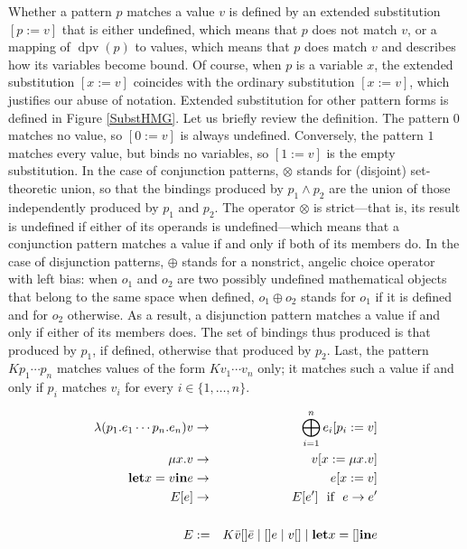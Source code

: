 \documentclass{article}
\newcommand{\assign}{:=}
\newcommand{\tmop}[1]{\ensuremath{\operatorname{#1}}}
\newcommand{\tmstrong}[1]{\textbf{#1}}
\begin{document}
Whether a pattern $p$ matches a value $v$ is defined by an extended
substitution $[p \assign v]$ that is either undefined, which means that $p$
does not match $v$, or a mapping of $\tmop{dpv} (p)$ to values, which means
that $p$ does match $v$ and describes how its variables become bound. Of
course, when $p$ is a variable $x$, the extended substitution $[x \assign v]$
coincides with the ordinary substitution $[x \assign v]$, which justifies our
abuse of notation. Extended substitution for other pattern forms is defined in
Figure \ref{SubstHMG}. Let us briefly review the definition. The pattern $0$
matches no value, so $[0 \assign v]$ is always undefined. Conversely, the
pattern $1$ matches every value, but binds no variables, so $[1 \assign v]$ is
the empty substitution. In the case of conjunction patterns, $\otimes$ stands
for (disjoint) set-theoretic union, so that the bindings produced by $p_1
\wedge p_2$ are the union of those independently produced by $p_1$ and $p_2$.
The operator $\otimes$ is strict---that is, its result is undefined if either
of its operands is undefined---which means that a conjunction pattern matches
a value if and only if both of its members do. In the case of disjunction
patterns, $\oplus$ stands for a nonstrict, angelic choice operator with left
bias: when $o_1$ and $o_2$ are two possibly undefined mathematical objects
that belong to the same space when defined, $o_1 \oplus o_2$ stands for $o_1$
if it is defined and for $o_2$ otherwise. As a result, a disjunction pattern
matches a value if and only if either of its members does. The set of bindings
thus produced is that produced by $p_1$, if defined, otherwise that produced
by $p_2$. Last, the pattern $K p_1 \cdots p_n$ matches values of the form $K
v_1 \cdots v_n$ only; it matches such a value if and only if $p_i$ matches
$v_i$ for every $i \in \{ 1, \ldots, n \}$.\begin{table}[t]
  \begin{eqnarray*}
    \lambda (p_1 .e_1 \cdots p_n .e_n) v & \rightarrow & \bigoplus_{i = 1}^n
    e_i [p_i \assign v]\\
    \mu x.v & \rightarrow & v [x \assign \mu x.v]\\
    \text{{\tmstrong{let}}} x = v \text{{\tmstrong{in}}} e & \rightarrow & e
    [x \assign v]\\
    E [e] & \rightarrow & E [e^{\prime}] \text{ \ if \ } e \rightarrow
    e^{\prime}\\
    &  & \\
    E & \assign & K \bar{v}  []  \bar{e} \; | \; [] e \; | \; v [] \; | \;
    \text{{\tmstrong{let}}} x = []  \text{{\tmstrong{in}}} e
  \end{eqnarray*}
  \label{SemantHMG}
  \caption{Operational semantics for $\tmop{HMG} (X)$}
\end{table}
\end{document}
